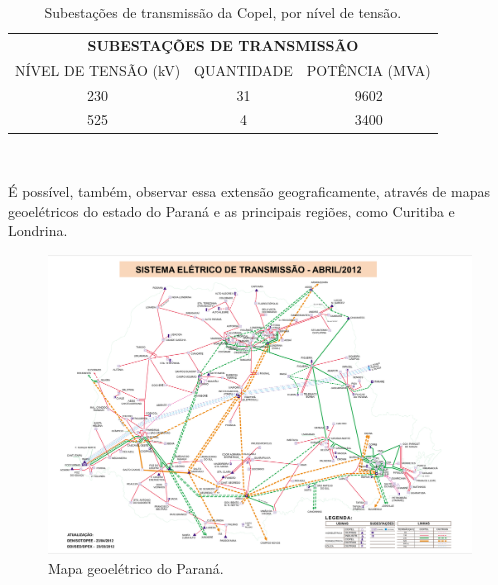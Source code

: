 \documentclass[grad,numbers]{coppe}
\begin{document}
  \begin{table}[H]

  \caption{\label{tab:unnamed-chunk-3}Subestações de transmissão da Copel, por nível de tensão.}
  \centering
  \begin{tabular}[t]{ccc}
  \toprule
  \multicolumn{3}{c}{\textbf{SUBESTAÇÕES DE TRANSMISSÃO}} \\
  \cmidrule(l{3pt}r{3pt}){1-3}
  NÍVEL DE TENSÃO (kV) & QUANTIDADE & POTÊNCIA (MVA)\\
  \midrule
  230 & 31 & 9602\\
  525 & 4 & 3400\\
  \bottomrule
  \end{tabular}
  \end{table}
  \(\,\)

  É possível, também, observar essa extensão geograficamente, através de mapas geoelétricos do estado do Paraná e as principais regiões, como Curitiba e Londrina.
  \begin{figure}[H]
  \includegraphics[width=1\linewidth]{img/mapa_geoeletrico_parana} \caption{Mapa geoelétrico do Paraná.}\label{fig:unnamed-chunk-4}
  \end{figure}
\end{document}
